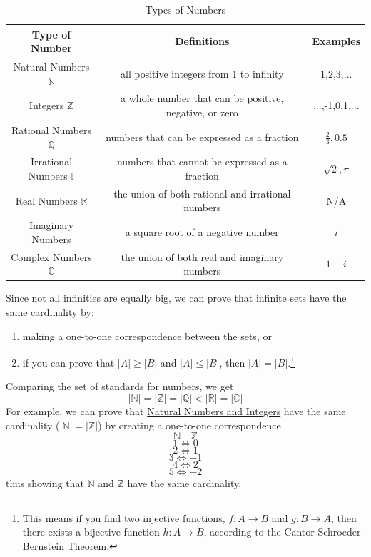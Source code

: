 \documentclass[12pt, letterpaper]{article}
\begin{document}
\begin{table}[h]
    \centering
    \begin{tabular}{|c|c|c|}
        \hline
        \textbf{Type of Number}  & \textbf{Definitions} & \textbf{Examples}  \\ \hline
        Natural Numbers \(\mathbb{N}\) & all positive integers from 1 to infinity & 1,2,3,... \\ \hline
        Integers \(\mathbb{Z}\) & a whole number that can be positive, negative, or zero  & ...,-1,0,1,...   \\ \hline
        Rational Numbers \(\mathbb{Q}\) &  numbers that can be expressed as a fraction  & \(\frac{2}{3}, 0.5\)   \\ \hline
        Irrational Numbers \(\mathbb{I}\) & numbers that cannot be expressed as a fraction & \(\sqrt{2}, \pi\)   \\ \hline
        Real Numbers \(\mathbb{R}\)  & the union of both rational and irrational numbers  & N/A  \\ \hline
        Imaginary Numbers & a square root of a negative number  & \(i\)  \\ \hline
        Complex Numbers \(\mathbb{C}\)  & the union of both real and imaginary numbers  & \(1+i\)  \\ \hline
    \end{tabular}
    \caption{Types of Numbers}
    \label{Table 1}
\end{table}
\pagebreak
\raggedright
Since not all infinities are equally big, we can prove that infinite sets have the same cardinality by:
\begin{enumerate}
    \item making a one-to-one correspondence between the sets, or 
    \item if you can prove that \(|A| \geq |B|\) and \(|A| \leq |B|\), then \(|A|=|B|\).\footnote{This means if you find two injective functions, \(f: A\rightarrow B\) and \(g: B\rightarrow A\), then there exists a bijective function \(h: A\rightarrow B\), according to the Cantor-Schroeder-Bernstein Theorem. }
\end{enumerate}
Comparing the set of standards for numbers, we get \[|\mathbb{N}|=|\mathbb{Z}|=|\mathbb{Q}|<|\mathbb{R}|=|\mathbb{C}|\] For example, we can prove that \underline{Natural Numbers and Integers} have the same cardinality (\(|\mathbb{N}|=|\mathbb{Z}|\)) by creating a one-to-one correspondence \[\mathbb{N}\quad\mathbb{Z}\] \[1\Leftrightarrow0\] \[2\Leftrightarrow1\] \[3\Leftrightarrow-1\] \[4\Leftrightarrow2\] \[5\Leftrightarrow-2\] \[...\] thus showing that \(\mathbb{N}\) and \(\mathbb{Z}\) have the same cardinality.
\vspace{1em}\\
\end{document}
